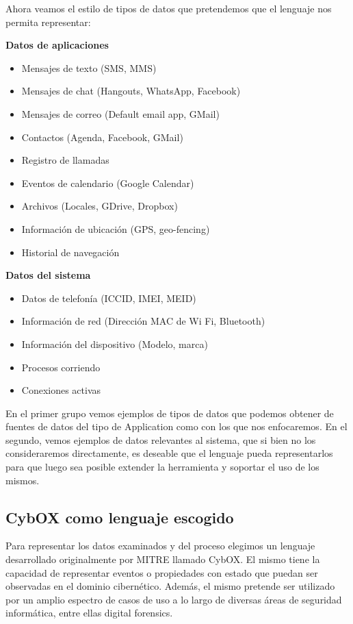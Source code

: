 Ahora veamos el estilo de tipos de datos que pretendemos que el lenguaje nos permita representar:

\textbf{Datos de aplicaciones}
\begin{itemize}
\item Mensajes de texto (SMS, MMS)
\item Mensajes de chat (Hangouts, WhatsApp, Facebook)
\item Mensajes de correo (Default email app, GMail)
\item Contactos (Agenda, Facebook, GMail)
\item Registro de llamadas
\item Eventos de calendario (Google Calendar)
\item Archivos (Locales, GDrive, Dropbox)
\item Información de ubicación (GPS, geo-fencing)
\item Historial de navegación
\end{itemize}

\textbf{Datos del sistema}
\begin{itemize}
\item Datos de telefonía (ICCID, IMEI, MEID)
\item Información de red (Dirección MAC de Wi Fi, Bluetooth)
\item Información del dispositivo (Modelo, marca)
\item Procesos corriendo
\item Conexiones activas
\end{itemize}

En el primer grupo vemos ejemplos de tipos de datos que podemos obtener de fuentes de datos del tipo de Application como con los que nos enfocaremos. En el segundo, vemos ejemplos de datos relevantes al sistema, que si bien no los consideraremos directamente, es deseable que el lenguaje pueda representarlos para que luego sea posible extender la herramienta y soportar el uso de los mismos.

\subsection{CybOX como lenguaje escogido}
Para representar los datos examinados y del proceso elegimos un lenguaje desarrollado originalmente por MITRE llamado CybOX. El mismo tiene la capacidad de representar eventos o propiedades con estado que puedan ser observadas en el dominio cibernético. Además, el mismo pretende ser utilizado por un amplio espectro de casos de uso a lo largo de diversas áreas de seguridad informática, entre ellas digital forensics.

